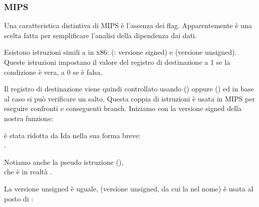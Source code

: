 \subsubsection{MIPS}

Una caratteristica distintiva di MIPS è l'assenza dei flag.
Apparentemente è una scelta fatta per semplificare l'analisi della dipendenza dai dati.


Esistono istruzioni simili a  in x86:  (: versione signed) e 
 (versione unsigned).
Queste istruzioni impostano il valore del registro di destinazione a 1 se la condizione è vera, a 0 se è falsa.


Il registro di destinazione viene quindi controllato usando  () oppure  () 
ed in base al caso si può verificare un salto.
Questa coppia di istruzioni è usata in MIPS per eseguire confronti e conseguenti branch.
Iniziamo con la versione signed della nostra funzione:



 è stata ridotta da Ida nella sua forma breve:\\
.

Notiamo anche la pseudo istruzione  (),\\
che è in realtà .


La versione unsigned è uguale,  (versione unsigned, da cui la  nel nome) è usata al posto di :



